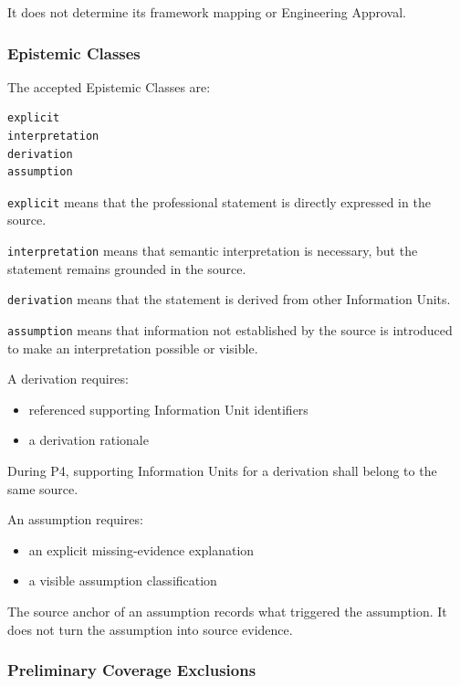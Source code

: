 It does not determine its framework mapping or Engineering Approval.

\hypertarget{epistemic-classes}{%
\subsubsection{Epistemic Classes}\label{epistemic-classes}}

The accepted Epistemic Classes are:

\begin{verbatim}
explicit
interpretation
derivation
assumption
\end{verbatim}

\texttt{explicit} means that the professional statement is directly expressed in the source.

\texttt{interpretation} means that semantic interpretation is necessary, but the statement remains grounded in the source.

\texttt{derivation} means that the statement is derived from other Information Units.

\texttt{assumption} means that information not established by the source is introduced to make an interpretation possible or visible.

A derivation requires:

\begin{itemize}
\tightlist
\item
  referenced supporting Information Unit identifiers
\item
  a derivation rationale
\end{itemize}

During P4, supporting Information Units for a derivation shall belong to the same source.

An assumption requires:

\begin{itemize}
\tightlist
\item
  an explicit missing-evidence explanation
\item
  a visible assumption classification
\end{itemize}

The source anchor of an assumption records what triggered the assumption. It does not turn the assumption into source evidence.

\hypertarget{preliminary-coverage-exclusions}{%
\subsubsection{Preliminary Coverage Exclusions}\label{preliminary-coverage-exclusions}}

